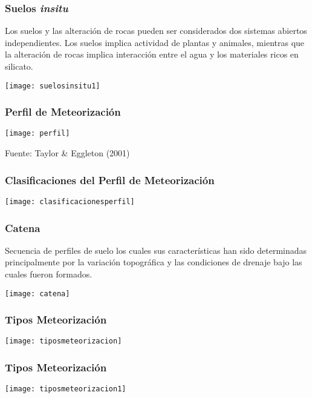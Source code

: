 \documentclass{beamer}
\begin{document}
\begin{frame}
\frametitle{Suelos \emph{insitu}}
\small{Los suelos y las alteración de rocas pueden ser considerados dos sistemas abiertos independientes. Los suelos implica actividad de plantas y animales, mientras que la alteración de rocas implica interacción entre el agua y los materiales ricos en silicato.}
\begin{center}
   	\texttt{[image: suelosinsitu1]}
\end{center}
\end{frame}
\begin{frame}
\frametitle{Perfil de Meteorización}
\begin{center}
   	\texttt{[image: perfil]}
\end{center}
\tiny{Fuente: Taylor \& Eggleton (2001)}
\end{frame}
\begin{frame}
\frametitle{Clasificaciones del Perfil de Meteorización}
\begin{center}
   	\texttt{[image: clasificacionesperfil]}
\end{center}
\end{frame}
\begin{frame}
\frametitle{Catena}
\small{Secuencia de perfiles de suelo los cuales sus características han sido determinadas  principalmente por la variación topográfica y las condiciones de drenaje bajo las cuales fueron formados.}
\begin{center}
   	\texttt{[image: catena]}
\end{center}
\end{frame}
\begin{frame}
\frametitle{Tipos Meteorización}
\begin{center}
   	\texttt{[image: tiposmeteorizacion]}
\end{center}
\end{frame}
\begin{frame}
\frametitle{Tipos Meteorización}
\begin{center}
   	\texttt{[image: tiposmeteorizacion1]}
\end{center}
\end{frame}
\end{document}
